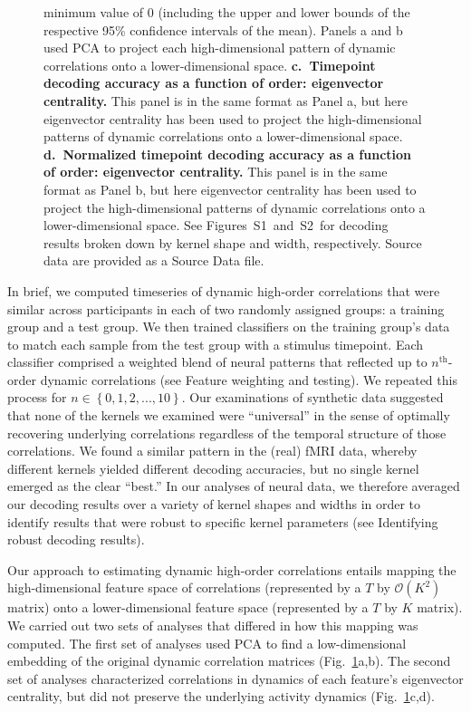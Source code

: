 \documentclass[english]{article}
\newcommand{\kernelshape}{S1}
\newcommand{\kernelwidth}{S2}
\begin{document}
\begin{figure}[tp]
{    minimum value of 0 (including the upper and lower bounds of the
    respective 95\% confidence intervals of the mean).  Panels a and b used PCA to
    project each high-dimensional pattern of dynamic correlations onto
    a lower-dimensional space. \textbf{c.~Timepoint decoding accuracy as a
       function of order: eigenvector centrality.} This panel is in the
    same format as Panel a, but here eigenvector centrality has been
    used to project the high-dimensional patterns of dynamic
    correlations onto a lower-dimensional space.
 \textbf{d.~Normalized timepoint decoding accuracy as a function of order:
       eigenvector centrality.}  This panel is in the same format as
    Panel b, but here eigenvector centrality has been used to project
    the high-dimensional patterns of dynamic correlations onto a
    lower-dimensional space. See
    Figures~\kernelshape~and~\kernelwidth~for decoding results broken
    down by kernel shape and width, respectively. Source data are provided as a Source Data file.}
  \label{fig:decoding}
\end{figure}

In brief, we computed timeseries of dynamic high-order correlations
that were similar across participants in each of two randomly assigned
groups: a training group and a test group.  We then trained
classifiers on the training group's data to match each sample from the
test group with a stimulus timepoint.  Each classifier comprised a
weighted blend of neural patterns that reflected up to
$n^\mathrm{th}$-order dynamic correlations (see Feature
  weighting and testing).  We repeated this process for
$n \in \left\{ 0, 1, 2, ..., 10 \right\}$.  Our examinations of
synthetic data suggested that none of the kernels we examined were
``universal'' in the sense of optimally recovering underlying
correlations regardless of the temporal structure of those
correlations.  We found a similar pattern in the (real) fMRI data,
whereby different kernels yielded different decoding accuracies, but
no single kernel emerged as the clear ``best.''  In our analyses of
neural data, we therefore averaged our decoding results over a variety
of kernel shapes and widths in order to identify results that were
robust to specific kernel parameters (see Identifying robust
  decoding results).

Our approach to estimating dynamic high-order correlations entails
mapping the high-dimensional feature space of correlations
(represented by a $T$ by
$\mathcal{O}(K^2)$ matrix) onto a lower-dimensional feature space
(represented by a $T$ by $K$ matrix).
We carried out two sets of analyses that differed in how this mapping
was computed.  The first set of analyses used PCA to find a
low-dimensional embedding of the original dynamic correlation matrices
(Fig.~\ref{fig:decoding}a,b).  The second set of analyses
characterized correlations in dynamics of each feature's eigenvector
centrality, but did not preserve the underlying activity dynamics
(Fig.~\ref{fig:decoding}c,d).
\end{document}
